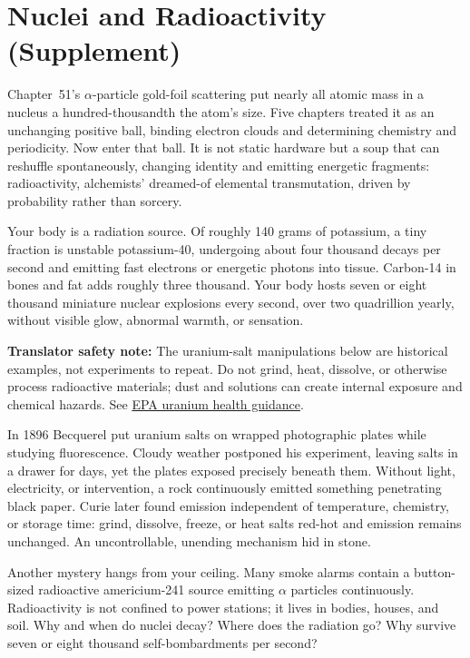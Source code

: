 \chapter{Nuclei and Radioactivity (Supplement)}

Chapter~51's \(\alpha\)-particle gold-foil scattering put nearly all atomic mass in a nucleus a hundred-thousandth the atom's size. Five chapters treated it as an unchanging positive ball, binding electron clouds and determining chemistry and periodicity. Now enter that ball. It is not static hardware but a soup that can reshuffle spontaneously, changing identity and emitting energetic fragments: radioactivity, alchemists' dreamed-of elemental transmutation, driven by probability rather than sorcery.


Your body is a radiation source. Of roughly 140 grams of potassium, a tiny fraction is unstable potassium-40, undergoing about four thousand decays per second and emitting fast electrons or energetic photons into tissue. Carbon-14 in bones and fat adds roughly three thousand. Your body hosts seven or eight thousand miniature nuclear explosions every second, over two quadrillion yearly, without visible glow, abnormal warmth, or sensation.

\textbf{Translator safety note:} The uranium-salt manipulations below are historical examples, not experiments to repeat. Do not grind, heat, dissolve, or otherwise process radioactive materials; dust and solutions can create internal exposure and chemical hazards. See \href{https://www.epa.gov/radiation/radionuclide-basics-uranium}{EPA uranium health guidance}.

In 1896 Becquerel put uranium salts on wrapped photographic plates while studying fluorescence. Cloudy weather postponed his experiment, leaving salts in a drawer for days, yet the plates exposed precisely beneath them. Without light, electricity, or intervention, a rock continuously emitted something penetrating black paper. Curie later found emission independent of temperature, chemistry, or storage time: grind, dissolve, freeze, or heat salts red-hot and emission remains unchanged. An uncontrollable, unending mechanism hid in stone.

Another mystery hangs from your ceiling. Many smoke alarms contain a button-sized radioactive americium-241 source emitting \(\alpha\) particles continuously. Radioactivity is not confined to power stations; it lives in bodies, houses, and soil. Why and when do nuclei decay? Where does the radiation go? Why survive seven or eight thousand self-bombardments per second?

